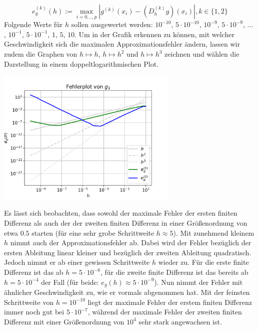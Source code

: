 \documentclass{scrartcl}
\newcommand{\abs}[1]{\left\lvert#1\right\rvert}
\begin{document}
\[e_g^{(k)}(h):=\max_{i=0,..,p}\abs{g^{(k)}(x_i)-(D_h^{(k)}g)(x_i)} , k \in \lbrace1, 2\rbrace\]
Folgende Werte für $h$ sollen ausgewertet werden: $10^{-10}$, $5 \cdot 10^{-10}$, $10^{-9}$, $5 \cdot 10^{-9}$, ... , $10^{-1}$, \linebreak  $5 \cdot 10^{-1}$, $1$, $5$, $10$.
Um in der Grafik erkennen zu können, mit welcher Geschwindigkeit sich die maximalen Approximationsfehler ändern, lassen wir zudem die Graphen von $h \mapsto h$, $h \mapsto h^{2}$ und $h \mapsto h^{3}$ zeichnen und wählen die Darstellung in einem doppeltlogarithmischen Plot.
\begin{center}
	\includegraphics[width=0.65\textwidth]{Grafiken/Fehlerplot_Aufgabe2}
  \vspace{-0.2cm}
  \vspace{0.5cm}
\end{center}
Es lässt sich beobachten, dass sowohl der maximale Fehler der ersten finiten Differenz als auch der der zweiten finiten Differenz in einer Größenordnung von etwa $0.5$ starten (für eine sehr grobe Schrittweite $h \approx 5$). Mit zunehmend kleinem $h$ nimmt auch der Approximationsfehler ab. Dabei wird der Fehler bezüglich der ersten Ableitung linear kleiner und bezüglich der zweiten Ableitung quadratisch. Jedoch nimmt er ab einer gewissen Schrittweite $h$ wieder zu. Für die erste finite Differenz ist das ab $h = 5\cdot10^{-8}$, für die zweite finite Differenz ist das bereits ab $h = 5 \cdot 10^{-4}$ der Fall (für beide: $e_g(h) \approx  5 \cdot 10^{-9}$). Nun nimmt der Fehler mit ähnlicher Geschwindigkeit zu, wie er vormals abgenommen hat. Mit der feinsten Schrittweite von $h = 10^{-10}$ liegt der maximale Fehler der erstem finiten Differenz immer noch gut bei $5 \cdot 10^{-7}$, während der maximale Fehler der zweiten finiten Differenz mit einer Größenordnung von $10^{4}$ sehr stark angewachsen ist. \\
\end{document}
